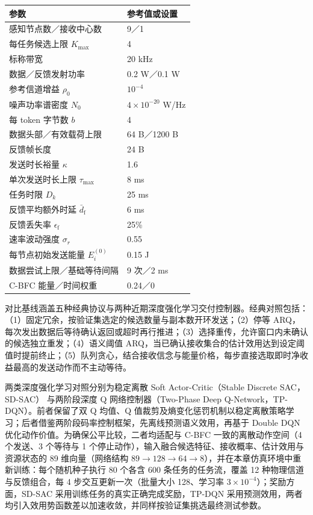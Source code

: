 \begin{table}[t]
  \centering\small
  \label{rq3:tab:parameters}
  \begin{tabularx}{\linewidth}{@{}Yl@{}}
    \toprule
    参数 & 参考值或设置\\
    \midrule
    感知节点数／接收中心数 & 9／1\\
    每任务候选上限 $K_{\max}$ & 4\\
    标称带宽 & 20 kHz\\
    数据／反馈发射功率 & 0.2 W／0.1 W\\
    参考信道增益 $\rho_0$ & $10^{-4}$\\
    噪声功率谱密度 $N_0$ & $4\times10^{-20}$ W/Hz\\
    每 token 字节数 $b$ & 4\\
    数据头部／有效载荷上限 & 64 B／1200 B\\
    反馈帧长度 & 24 B\\
    发送时长裕量 $\kappa$ & 1.6\\
    单次发送时长上限 $\tau_{\max}$ & 8 ms\\
    任务时限 $D_k$ & 25 ms\\
    反馈平均额外时延 $\bar d_{\mathrm f}$ & 6 ms\\
    反馈丢失率 $\epsilon_{\mathrm f}$ & 25\%\\
    速率波动强度 $\sigma_r$ & 0.55\\
    每节点初始发送能量 $E_i^{(0)}$ & 0.15 J\\
    数据尝试上限／基础等待间隔 & 9 次／2 ms\\
    C-BFC 能量／时间权重 & 0.24／0\\
    \bottomrule
  \end{tabularx}
\end{table}

对比基线涵盖五种经典协议与两种近期深度强化学习交付控制器。经典对照包括：（1）固定冗余，按验证集选定的候选数量与副本数开环发送；（2）停等 ARQ，每次发出数据后等待确认返回或超时再行推进；（3）选择重传，允许窗口内未确认的候选独立重发；（4）语义阈值 ARQ，当已确认接收集合的估计效用达到设定阈值时提前终止；（5）队列贪心，结合接收信念与能量价格，每步直接选取即时净收益最高的发送动作而不主动等待。

两类深度强化学习对照分别为稳定离散 Soft Actor-Critic（Stable Discrete SAC，SD-SAC）\citep{zhou2024sdsac} 与两阶段深度 Q 网络控制器（Two-Phase Deep Q-Network，TP-DQN）\citep{wu2026twophase}。前者保留了双 Q 均值、Q 值裁剪及熵变化惩罚机制以稳定离散策略学习；后者借鉴两阶段码率控制框架，先离线预测语义效用，再基于 Double DQN 优化动作价值。为确保公平比较，二者均适配与 C-BFC 一致的离散动作空间（4 个发送、3 个等待与 1 个停止动作），输入融合候选特征、接收概率、估计效用与资源状态的 89 维向量（网络结构 $89\rightarrow128\rightarrow64\rightarrow8$），并在本章仿真环境中重新训练：每个随机种子执行 80 个各含 600 条任务的任务流，覆盖 12 种物理信道与反馈组合，每 4 步交互更新一次（批量大小 128、学习率 $3\times10^{-4}$）；奖励方面，SD-SAC 采用训练任务的真实正确完成奖励，TP-DQN 采用预测效用，两者均引入效用势函数差以加速收敛，并同样按验证集挑选最终测试参数。


